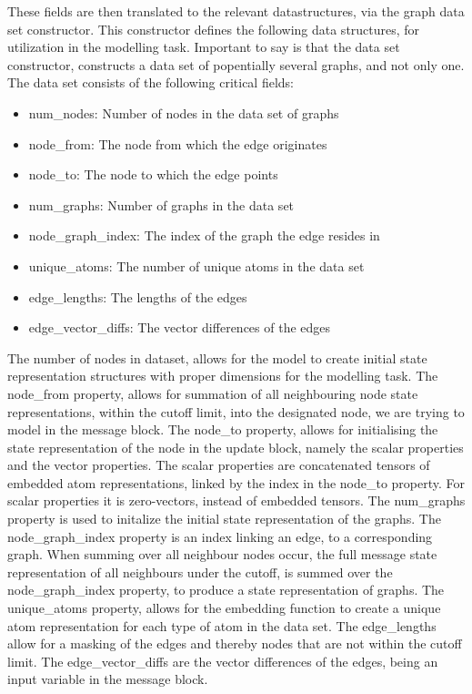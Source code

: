 These fields are then translated to the relevant datastructures, via the graph data set constructor. This constructor
defines the following data structures, for utilization in the modelling task. Important to say is that the data set constructor,
constructs a data set of popentially several graphs, and not only one. The data set consists of the following critical fields:
\begin{itemize}
    \item num\_nodes: Number of nodes in the data set of graphs
    \item node\_from: The node from which the edge originates
    \item node\_to: The node to which the edge points
    \item num\_graphs: Number of graphs in the data set
    \item node\_graph\_index: The index of the graph the edge resides in
    \item unique\_atoms: The number of unique atoms in the data set
    \item edge\_lengths: The lengths of the edges
    \item edge\_vector\_diffs: The vector differences of the edges
\end{itemize}

The number of nodes in dataset, allows for the model to create initial state representation structures with proper dimensions for the
modelling task. The node\_from property, allows for summation of all neighbouring node state representations, within the cutoff limit,
into the designated node, we are trying to model in the message block. The node\_to property, allows for initialising the state representation
of the node in the update block, namely the scalar properties and the vector properties. The scalar properties are concatenated tensors of
embedded atom representations, linked by the index in the node\_to property. For scalar properties it is zero-vectors, instead of embedded
tensors. The num\_graphs property is used to initalize the initial state representation of the graphs. The node\_graph\_index property
is an index linking an edge, to a corresponding graph. When summing over all neighbour nodes occur, the full message state representation of all
neighbours under the cutoff, is summed over the node\_graph\_index property, to produce a state representation of graphs. The unique\_atoms
property, allows for the embedding function to create a unique atom representation for each type of atom in the data set. The edge\_lengths
allow for a masking of the edges and thereby nodes that are not within the cutoff limit. The edge\_vector\_diffs are the vector differences
of the edges, being an input variable in the message block.



